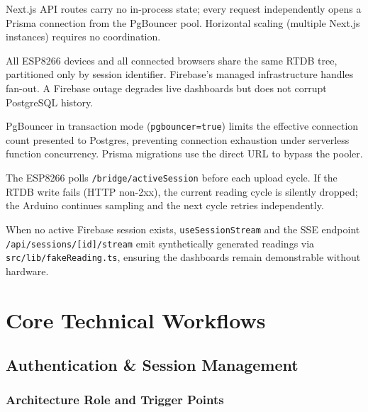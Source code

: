 \documentclass[12pt,a4paper]{report}
\begin{document}
\begin{description}[leftmargin=0em]
  \item[Stateless API tier] Next.js API routes carry no in-process
    state; every request independently opens a Prisma connection from
    the PgBouncer pool. Horizontal scaling (multiple Next.js instances)
    requires no coordination.

  \item[Firebase as shared bus] All ESP8266 devices and all connected
    browsers share the same RTDB tree, partitioned only by session
    identifier. Firebase's managed infrastructure handles fan-out.
    A Firebase outage degrades live dashboards but does not corrupt
    PostgreSQL history.

  \item[PostgreSQL connection pool] PgBouncer in transaction mode
    (\texttt{pgbouncer=true}) limits the effective connection count
    presented to Postgres, preventing connection exhaustion under
    serverless function concurrency. Prisma migrations use the
    direct URL to bypass the pooler.

  \item[Hardware resilience] The ESP8266 polls \texttt{/bridge/activeSession}
    before each upload cycle. If the RTDB write fails (HTTP non-2xx),
    the current reading cycle is silently dropped; the Arduino continues
    sampling and the next cycle retries independently.

  \item[Fallback / demo mode] When no active Firebase session exists,
    \texttt{useSessionStream} and the SSE endpoint
    \texttt{/api/sessions/[id]/stream} emit synthetically generated
    readings via \texttt{src/lib/fakeReading.ts}, ensuring the
    dashboards remain demonstrable without hardware.
\end{description}

\chapter{Core Technical Workflows}
\label{ch:workflows}

\section{Authentication \& Session Management}
\label{sec:auth}

\subsection{Architecture Role and Trigger Points}
\end{document}
